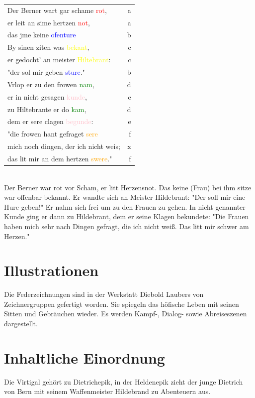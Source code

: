 \documentclass[a4paper, 12pt, oneside]{scrbook}
\begin{document}
\begin{tabular}{lr}
Der Berner wart gar schame \textcolor{red}{rot}, & a \\
er leit an sime hertzen \textcolor{red}{not}, & a \\
das jme keine \textcolor{blue}{ofenture} & b \\
By sinen ziten was \textcolor{yellow}{bekant}, & c \\
er gedocht' an meister \textcolor{yellow}{Hiltebrant}: & c \\
"der sol mir geben \textcolor{blue}{sture}." & b \\
Vrlop er zu den frowen \textcolor{green}{nam}, & d \\
er in nicht gesagen \textcolor{pink}{kunde}, & e \\
zu Hiltebrante er do \textcolor{green}{kam}, & d \\
dem er sere clagen \textcolor{pink}{begunde}: & e \\
"die frowen hant gefraget \textcolor{orange}{sere} & f \\
mich noch dingen, der ich nicht weis; & x \\
das lit mir an dem hertzen \textcolor{orange}{swere}." & f \\
\end{tabular}\cite{ubh_bernerton}\\

Der Berner war rot vor Scham, er litt Herzensnot. Das keine (Frau) bei ihm sitze war offenbar bekannt. Er wandte sich an Meister Hildebrant: "Der soll mir eine Hure geben!" Er nahm sich frei um zu den Frauen zu gehen. In nicht genannter Kunde ging er dann zu Hildebrant, dem er seine Klagen bekundete: "Die Frauen haben mich sehr nach Dingen gefragt, die ich nicht weiß. Das litt mir schwer am Herzen."\cite{wiki_bernerton}

\section{Illustrationen}
Die Federzeichnungen sind in der Werkstatt Diebold Laubers von Zeichnergruppen gefertigt worden. Sie spiegeln das höfische Leben mit seinen Sitten und Gebräuchen wieder. Es werden Kampf-, Dialog- sowie Abreiseszenen dargestellt.\cite{ubheidelber_bibpal}

\section{Inhaltliche Einordnung}
Die Virtigal gehört zu Dietrichepik, in der Heldenepik zieht der junge Dietrich von Bern mit seinem Waffenmeister Hildebrand zu Abenteuern aus. 
\end{document}
